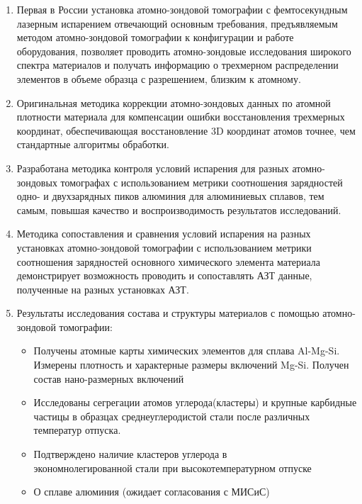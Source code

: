 \clearpage
{}
\begin{enumerate}[beginpenalty=10000] %
  \item Первая в России установка атомно-зондовой томографии с фемтосекундным лазерным испарением отвечающий основным требования, предъявляемым методом атомно-зондовой томографии к конфигурации и работе оборудования, позволяет проводить атомно-зондовые исследования широкого спектра материалов  и получать информацию о трехмерном распределении элементов в объеме образца с разрешением, близким к атомному.
  \item Оригинальная методика коррекции атомно-зондовых данных по атомной плотности материала для компенсации ошибки восстановления трехмерных координат, обеспечивающая восстановление 3D координат атомов точнее, чем стандартные алгоритмы обработки.     
  \item Разработана методика контроля условий испарения для разных атомно-зондовых томографах с использованием метрики соотношения зарядностей одно- и двухзарядных пиков алюминия для алюминиевых сплавов, тем самым, повышая качество и воспроизводимость результатов исследований.
  \item Методика сопоставления и сравнения условий испарения на разных установках атомно-зондовой томографии с использованием метрики соотношения зарядностей основного химического элемента материала демонстрирует возможность проводить и сопоставлять АЗТ данные, полученные на разных установках АЗТ.
  \item Результаты исследования состава и структуры материалов с помощью атомно-зондовой томографии:
  \begin{itemize}
  	\item Получены атомные карты химических элементов для сплава Al-Mg-Si. Измерены плотность и характерные размеры включений Mg-Si. Получен состав нано-размерных включений
  	\item Исследованы сегрегации атомов углерода(кластеры) и крупные карбидные частицы в образцах среднеуглеродистой стали после различных температур отпуска.
  	\item Подтверждено наличие кластеров углерода в \\ экономнолегированной стали при высокотемпературном отпуске
  	\item О сплаве алюминия (ожидает согласования с МИСиС)
  \end{itemize}
  
  
\end{enumerate}

